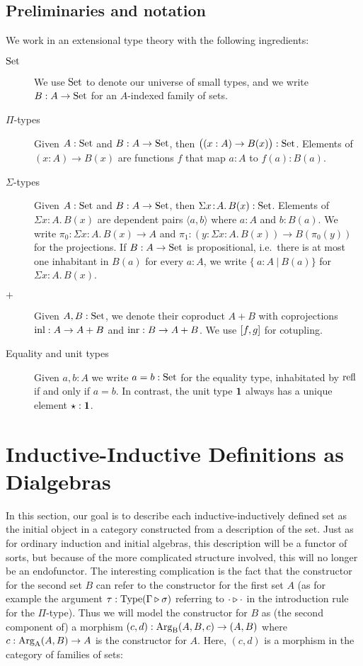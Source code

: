 \documentclass[orivec,envcountsame, ,envcountsect]{llncs}
\begin{document}
\subsection{Preliminaries and notation}

We work in an extensional type theory \cite{NPS1990book} with the
following ingredients:
\begin{description}
\item[$\text{Set}$] We use $\text{Set}$ to denote our universe of small types, and
  we write $B : A \to \text{Set}$ for an $A$-indexed family of sets.
\item[$\Pi$-types] Given $A : \text{Set}$ and $B : A \to \text{Set}$, then $\big((x :
  A) \to B(x)\big) : \text{Set}$.  Elements of $(x : A) \to B(x)$ are
  functions $f$ that map $a : A$ to $f(a) : B(a)$.
\item[$\Sigma$-types] Given $A : \text{Set}$ and $B : A \to \text{Set}$, then
  $\Sigma x\!:\!A.\, B(x) : \text{Set}$. Elements of $\Sigma x\!:\!A.\,
  B(x)$ are dependent pairs $\langle a, b\rangle$ where $a : A$ and $b : B(a)$.
  We write $\pi_0 : \Sigma x\!:\!A.\, B(x) \to A$ and $\pi_1 : (y :
  \Sigma x\!:\!A.\, B(x)) \to B(\pi_0(y))$ for the projections.  If $B
  : A \to \text{Set}$ is propositional, i.e.\ there is at most one
  inhabitant in $B(a)$ for every $a : A$, we write $\{\ a : A\ |\
  B(a)\}$ for $\Sigma x\!:\!A.\, B(x)$.
\item[$+$] Given $A, B : \text{Set}$, we denote their coproduct $A + B$ with
  coprojections $\text{inl} : A \to A + B$ and $\text{inr} : B \to A + B$. We
  use $[f, g]$ for cotupling.
\item[Equality and unit types] Given $a, b : A$ we write $a = b :
  \text{Set}$ for the equality type, inhabitated by $\text{refl}$ if and only if
  $a = b$. In contrast, the unit type $\mathbf{1}$
always has a unique element  $\star : \mathbf{1}$.
\end{description}


\section{Inductive-Inductive Definitions as Dialgebras}
\label{sec:indind-as-dialg}

In this section, our goal is to describe each inductive-inductively
defined set as the initial object in a category constructed from a
description of the set. Just as for ordinary induction and initial
algebras, this description will be a functor of sorts, but because of
the more complicated structure involved, this will no longer be an
endofunctor.
The interesting complication is the fact that the
constructor for the second set $B$ can refer to the constructor for
the first set $A$ (as for example the argument $\tau :
\text{Type}(\Gamma \triangleright \sigma)$ referring to
$\cdot \triangleright \cdot$ in the introduction rule for the
$\Pi$-type). 
Thus we will model the constructor for $B$ as (the second component
of) a morphism $(c, d) : \text{Arg}_{\text{B}}(A, B, c) \to (A, B)$ where $c :
\text{Arg}_{\text{A}}(A, B) \to A$ is the constructor for $A$. Here, $(c, d)$ is a
morphism in the category of families of sets:
\end{document}
